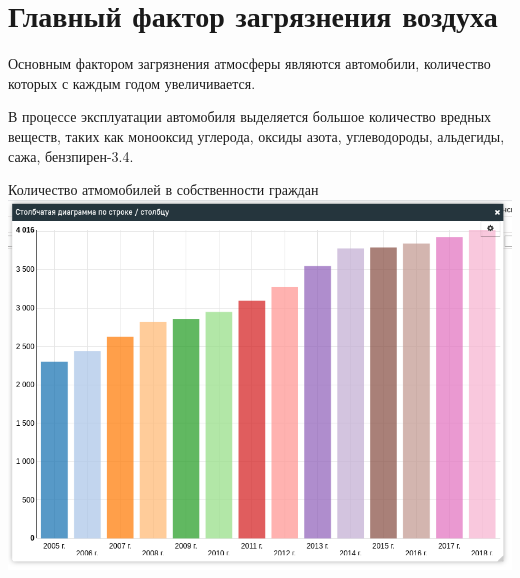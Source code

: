 
\section{Главный фактор загрязнения воздуха}
\begin{frame}{\insertsectionhead}
    \begin{minipage}{0.55\textwidth}
        \footnotesize
        Основным фактором загрязнения атмосферы
        являются автомобили, количество которых
        с каждым годом увеличивается.

        \medskip

        В процессе эксплуатации автомобиля выделяется большое количество
        вредных веществ, таких как монооксид углерода, оксиды азота, 
        углеводороды, альдегиды, сажа, бензпирен-3.4.

    \end{minipage}
    \begin{minipage}{0.43\textwidth}
        \tiny
        Количество атмомобилей в собственности граждан
        \includegraphics[width=\textwidth]{assets/car_stats.png}
    \end{minipage}
\end{frame}

